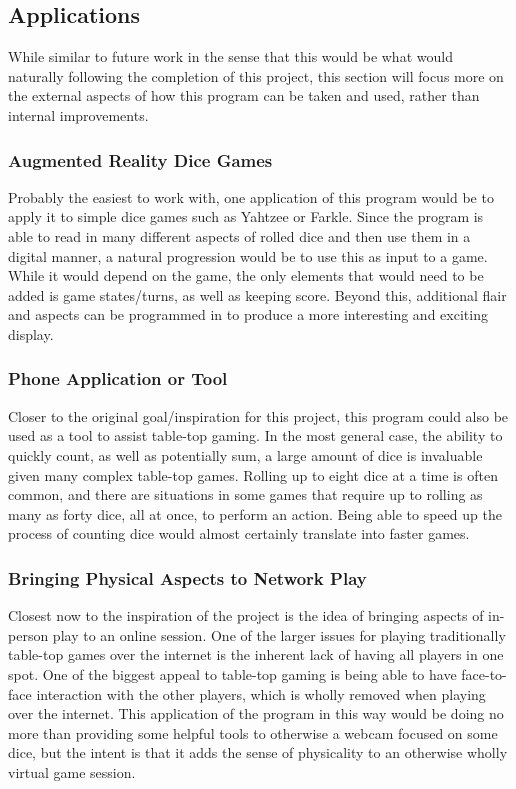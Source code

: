 \documentclass[journal]{IEEEtran}
\begin{document}
\subsection{Applications}
While similar to future work in the sense that this would be what would naturally following the completion of this project, this section will focus more on the external aspects of how this program can be taken and used, rather than internal improvements.\\

\subsubsection{Augmented Reality Dice Games}
Probably the easiest to work with, one application of this program would be to apply it to simple dice games such as Yahtzee or Farkle. Since the program is able to read in many different aspects of rolled dice and then use them in a digital manner, a natural progression would be to use this as input to a game. While it would depend on the game, the only elements that would need to be added is game states/turns, as well as keeping score. Beyond this, additional flair and aspects can be programmed in to produce a more interesting and exciting display.\\

\subsubsection{Phone Application or Tool}
Closer to the original goal/inspiration for this project, this program could also be used as a tool to assist table-top gaming. In the most general case, the ability to quickly count, as well as potentially sum, a large amount of dice is invaluable given many complex table-top games. Rolling up to eight dice at a time is often common, and there are situations in some games that require up to rolling as many as forty dice, all at once, to perform an action. Being able to speed up the process of counting dice would almost certainly translate into faster games.\\

\subsubsection{Bringing Physical Aspects to Network Play}
Closest now to the inspiration of the project is the idea of bringing aspects of in-person play to an online session. One of the larger issues for playing traditionally table-top games over the internet is the inherent lack of having all players in one spot. One of the biggest appeal to table-top gaming is being able to have face-to-face interaction with the other players, which is wholly removed when playing over the internet. This application of the program in this way would be doing no more than providing some helpful tools to otherwise a webcam focused on some dice, but the intent is that it adds the sense of physicality to an otherwise wholly virtual game session.\\
\end{document}
